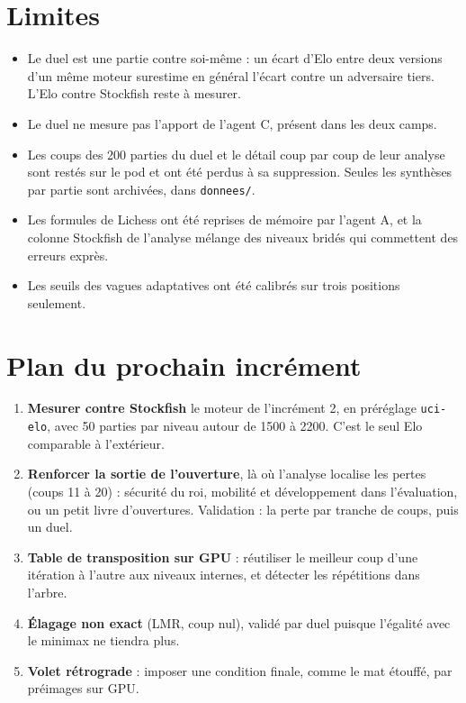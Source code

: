 \documentclass[11pt,a4paper]{article}
\newcommand{\code}[1]{\texttt{#1}}
\begin{document}
\section{Limites}
\begin{itemize}
\item Le duel est une partie contre soi-même : un écart d'Elo entre deux versions d'un même moteur
surestime en général l'écart contre un adversaire tiers. L'Elo contre Stockfish reste à mesurer.
\item Le duel ne mesure pas l'apport de l'agent C, présent dans les deux camps.
\item Les coups des 200 parties du duel et le détail coup par coup de leur analyse sont restés sur le
pod et ont été perdus à sa suppression. Seules les synthèses par partie sont archivées, dans
\code{donnees/}.
\item Les formules de Lichess ont été reprises de mémoire par l'agent A, et la colonne Stockfish de
l'analyse mélange des niveaux bridés qui commettent des erreurs exprès.
\item Les seuils des vagues adaptatives ont été calibrés sur trois positions seulement.
\end{itemize}

\section{Plan du prochain incrément}
\begin{enumerate}
\item \textbf{Mesurer contre Stockfish} le moteur de l'incrément 2, en préréglage \code{uci-elo},
avec 50 parties par niveau autour de 1500 à 2200. C'est le seul Elo comparable à l'extérieur.
\item \textbf{Renforcer la sortie de l'ouverture}, là où l'analyse localise les pertes (coups 11 à
20) : sécurité du roi, mobilité et développement dans l'évaluation, ou un petit livre
d'ouvertures. Validation : la perte par tranche de coups, puis un duel.
\item \textbf{Table de transposition sur GPU} : réutiliser le meilleur coup d'une itération à
l'autre aux niveaux internes, et détecter les répétitions dans l'arbre.
\item \textbf{Élagage non exact} (LMR, coup nul), validé par duel puisque l'égalité avec le
minimax ne tiendra plus.
\item \textbf{Volet rétrograde} : imposer une condition finale, comme le mat étouffé, par
préimages sur GPU.
\end{enumerate}
\end{document}
